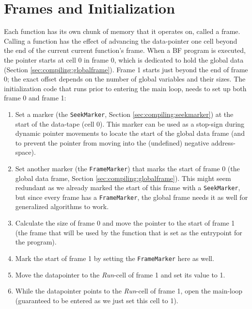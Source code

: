 \section{Frames and Initialization}
Each function has its own chunk of memory that it operates on, called a frame. Calling a function has the effect of advancing the data-pointer one cell beyond the end of the current current function's frame. When a BF program is executed, the pointer starts at cell 0 in frame 0, which is dedicated to hold the global data (Section \ref{sec:compiling:globalframe}). Frame 1 starts just beyond the end of frame 0; the exact offset depends on the number of global variables and their sizes. The initialization code that runs prior to entering the main loop, needs to set up both frame 0 and frame 1:
%
\begin{enumerate}
\item Set a marker (the \texttt{SeekMarker}, Section \ref{sec:compiling:seekmarker}) at the start of the data-tape (cell 0). This marker can be used as a stop-sign during dynamic pointer movements to locate the start of the global data frame (and to prevent the pointer from moving into the (undefined) negative address-space).
\item Set another marker (the \texttt{FrameMarker}) that marks the start of frame 0 (the global data frame, Section \ref{sec:compiling:globalframe}). This might seem redundant as we already marked the start of this frame with a \texttt{SeekMarker}, but since every frame has a \texttt{FrameMarker}, the global frame needs it as well for generalized algorithms to work.
\item Calculate the size of frame 0 and move the pointer to the start of frame 1 (the frame that will be used by the function that is set as the entrypoint for the program). 
\item Mark the start of frame 1 by setting the \texttt{FrameMarker} here as well.
\item Move the datapointer to the \emph{Run}-cell of frame 1 and set its value to 1.
\item While the datapointer points to the \emph{Run}-cell of frame 1, open the main-loop (guaranteed to be entered as we just set this cell to 1).
\end{enumerate}

